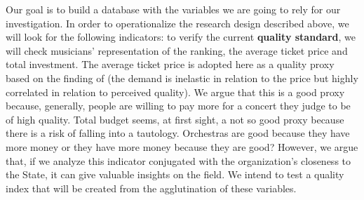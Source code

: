 \documentclass[a4paper, 12pt, openright, oneside, german, french, brazil, english]{abntex2}
\begin{document}
	
	Our goal is to build a database with the variables we are going to rely for our investigation. In order to operationalize the research design described above, we will look for the following indicators: to verify the current \textbf{quality standard}, we will check musicians' representation of the ranking, the average ticket price and total investment. The average ticket price is adopted here as a quality proxy based on the finding of  (the demand is inelastic in relation to the price but highly correlated in relation to perceived quality). We argue that this is a good proxy because, generally, people are willing to pay more for a concert they judge to be of high quality. Total budget seems, at first sight, a not so good proxy because there is a risk of falling into a tautology. Orchestras are good because they have more money or they have more money because they are good? However, we argue that, if we analyze this indicator conjugated with the organization's closeness to the State, it can give valuable insights on the field. We intend to test a quality index that will be created from the agglutination of these variables.
	
\end{document}
